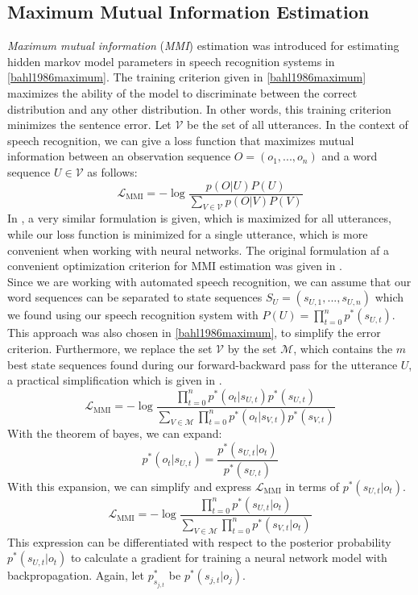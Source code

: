 \subsection{Maximum Mutual Information Estimation}
\textit{Maximum mutual information} (\textit{MMI}) estimation was introduced for estimating hidden markov model parameters in speech recognition systems in \ref{bahl1986maximum}. The training criterion given in \ref{bahl1986maximum} maximizes the ability of the model to discriminate between the correct distribution and any other distribution. In other words, this training criterion minimizes the sentence error. Let $\mathcal{V}$ be the set of all utterances. In the context of speech recognition, we can give a loss function that maximizes mutual information between an observation sequence $O = (o_1, ..., o_n)$ and a word sequence $U \in \mathcal{V}$ as follows:
\[
\mathcal{L}_{\text{MMI}} = -\log\frac{p(O|U)P(U)}{\sum_{V \in \mathcal{V}} p(O|V)P(V)} 
\]
In \cite{ghoshal2013sequence}, a very similar formulation is given, which is maximized for all utterances, while our loss function is minimized for a single utterance, which is more convenient when working with neural networks. The original formulation af a convenient optimization criterion for MMI estimation was given in \cite{schluter1998comparison}.\\
Since we are working with automated speech recognition, we can assume that our word sequences can be separated to state sequences $S_U = (s_{U,1},...,s_{U,n})$ which we found using our speech recognition system with $P(U) = \prod_{t = 0}^{n} p^*(s_{U,t})$. This approach was also chosen in \ref{bahl1986maximum}, to simplify the error criterion. Furthermore, we replace the set $\mathcal{V}$ by the set $\mathcal{M}$, which contains the $m$ best state sequences found during our forward-backward pass for the utterance $U$, a practical simplification which is given in \cite{schluter1998comparison}.
\[
\mathcal{L}_{\text{MMI}} = -\log\frac{\prod_{t = 0}^{n} p^*(o_{t}|s_{U,t})p^*(s_{U,t})}{\sum_{V \in \mathcal{M}} \prod_{t = 0}^{n} p^*(o_{t}|s_{V,t})p^*(s_{V,t})} 
\]
With the theorem of bayes, we can expand:
\[
p^*(o_{t}|s_{U,t}) = \frac{p^*(s_{U,t}|o_{t})}{p^*(s_{U,t})}
\]
With this expansion, we can simplify and express $\mathcal{L}_{\text{MMI}}$ in terms of $p^*(s_{U,t}|o_{t})$.
\[
\mathcal{L}_{\text{MMI}} = -\log\frac{\prod_{t = 0}^{n} p^*(s_{U,t}|o_{t})}{\sum_{V \in \mathcal{M}} \prod_{t = 0}^{n} p^*(s_{V,t}|o_{t})} 
\]
This expression can be differentiated with respect to the posterior probability $p^*(s_{U,t}|o_{t})$ to calculate a gradient for training a neural network model with backpropagation. Again, let $p^*_{s_{j,t}}$ be $p^*(s_{j,t}|o_j)$.

